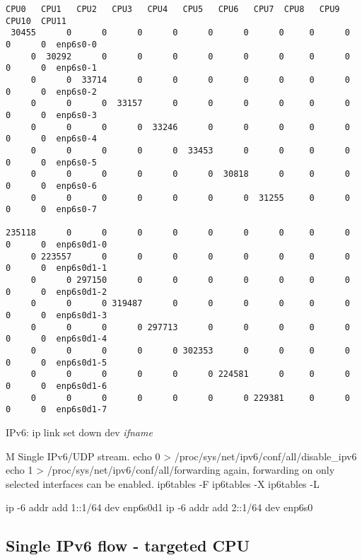 \begin{lstlisting}[basicstyle=\tiny]
  CPU0   CPU1   CPU2   CPU3   CPU4   CPU5   CPU6   CPU7  CPU8   CPU9   CPU10  CPU11
 30455      0      0      0      0      0      0      0     0      0      0      0  enp6s0-0
     0  30292      0      0      0      0      0      0     0      0      0      0  enp6s0-1
     0      0  33714      0      0      0      0      0     0      0      0      0  enp6s0-2
     0      0      0  33157      0      0      0      0     0      0      0      0  enp6s0-3
     0      0      0      0  33246      0      0      0     0      0      0      0  enp6s0-4
     0      0      0      0      0  33453      0      0     0      0      0      0  enp6s0-5
     0      0      0      0      0      0  30818      0     0      0      0      0  enp6s0-6
     0      0      0      0      0      0      0  31255     0      0      0      0  enp6s0-7

235118      0      0      0      0      0      0      0     0      0      0      0  enp6s0d1-0
     0 223557      0      0      0      0      0      0     0      0      0      0  enp6s0d1-1
     0      0 297150      0      0      0      0      0     0      0      0      0  enp6s0d1-2
     0      0      0 319487      0      0      0      0     0      0      0      0  enp6s0d1-3
     0      0      0      0 297713      0      0      0     0      0      0      0  enp6s0d1-4
     0      0      0      0      0 302353      0      0     0      0      0      0  enp6s0d1-5
     0      0      0      0      0      0 224581      0     0      0      0      0  enp6s0d1-6
     0      0      0      0      0      0      0 229381     0      0      0      0  enp6s0d1-7
\end{lstlisting}





\newpage



IPv6:
ip link set down dev {\it{ifname}}

M
Single IPv6/UDP stream.
echo 0 > /proc/sys/net/ipv6/conf/all/disable\_ipv6
echo 1 > /proc/sys/net/ipv6/conf/all/forwarding
again, forwarding on only selected interfaces can be enabled.
ip6tables -F
ip6tables -X
ip6tables -L

ip -6 addr add 1::1/64 dev enp6s0d1
ip -6 addr add 2::1/64 dev enp6s0


\subsection{Single IPv6 flow - targeted CPU}

